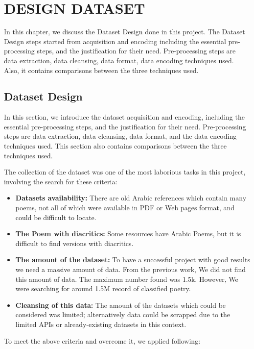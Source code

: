 \chapter{\uppercase{Design Dataset}}\label{Ch:Dataset}
{\color{red} In this chapter, we discuss the Dataset Design done in this project. The Dataset Design steps started from acquisition and encoding including the essential pre-processing steps, and the justification for their need. Pre-processing steps are data extraction, data cleansing, data format, data encoding techniques used. Also, it contains comparisons between the three techniques used.}

\clearpage

\section{Dataset Design}

In this section, we introduce the dataset acquisition and encoding, including the essential pre-processing steps, and the justification for their need. Pre-processing steps are data extraction, data cleansing, data format, and the data encoding techniques used. This section also contains comparisons between the three techniques used.

The collection of the dataset was one of the most laborious tasks in this project, involving the search for these criteria:

\begin{itemize}
 
 \item \textbf{Datasets availability:} There are old Arabic references which contain many poems, not all of which were available in PDF or Web pages format, and could be difficult to locate.
 
 \item \textbf{The Poem with diacritics:} Some resources have Arabic Poems, but it is difficult to find versions with diacritics.
 
 \item \textbf{The amount of the dataset:} To have a successful project with good results we need a massive amount of data. From the previous work, We did not find this amount of data. The maximum number found was 1.5k. However, We were searching for around 1.5M record of classified poetry.

 
 \item \textbf{Cleansing of this data:} The amount of the datasets which could be considered was limited; alternatively data could be scrapped due to the limited APIs or already-existing datasets in this context.
 
\end{itemize}
To meet the above criteria and overcome it, we applied following:

